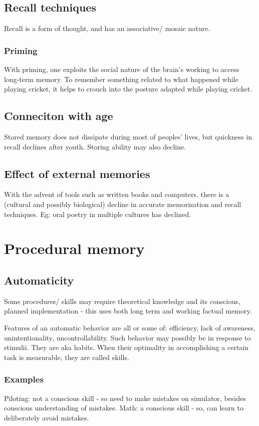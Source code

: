 \documentclass[oneside, article]{memoir}
\begin{document}
\section{Recall techniques}
Recall is a form of thought, and has an associative/ mosaic nature.

\subsection{Priming}
With priming, one exploits the social nature of the brain's working to access long-term memory. To remember something related to what happened while playing cricket, it helps to crouch into the posture adapted while playing cricket.

\section{Conneciton with age}
Stored memory does not dissipate during most of peoples' lives, but quickness in recall declines after youth. Storing ability may also decline. \tbc

\section{Effect of external memories}
With the advent of tools such as written books and computers, there is a (cultural and possibly biological) decline in accurate memorization and recall techniques. Eg: oral poetry in multiple cultures has declined.


\chapter{Procedural memory}
\section{Automaticity}
Some procedures/ skills may require theoretical knowledge and its conscious, planned implementation - this uses both long term and working factual memory.

Features of an automatic behavior are all or some of: efficiency, lack of awareness, unintentionality, uncontrollability. Such behavior may possibly be in response to stimulii. They are aka habits. When their optimality in accomplishing a certain task is measurable, they are called skills.

\subsection{Examples}
Piloting: not a conscious skill - so need to make mistakes on simulator, besides conscious understanding of mistakes. Math: a conscious skill - so, can learn to deliberately avoid mistakes.
\end{document}
